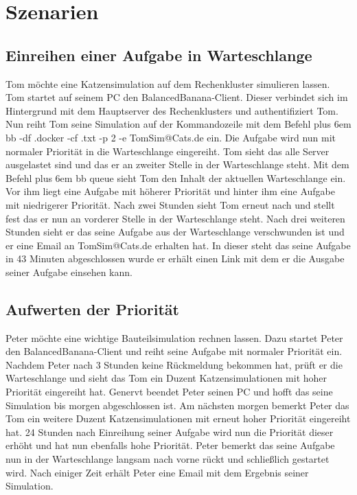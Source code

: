 \documentclass[a4paper,12pt]{article}
\makeatletter
\newenvironment{mycode}
 {\def\@xobeysp{\ }\verbatim\rightskip=0pt plus 6em\relax}
 {\endverbatim}
\makeatother
\begin{document}

\section{Szenarien}

\subsection{\textbf{Einreihen einer Aufgabe in Warteschlange}}
Tom möchte eine Katzensimulation auf dem Rechenkluster simulieren lassen. %
Tom startet auf seinem PC den BalancedBanana-Client. Dieser verbindet sich im Hintergrund mit dem Hauptserver des Rechenklusters und authentifiziert Tom.
Nun reiht Tom seine Simulation auf der Kommandozeile mit dem Befehl 
\begin{mycode}
	bb -df \CatSimulation.docker -cf \Config.txt -p 2 -e TomSim@Cats.de
\end{mycode}
ein. %
Die Aufgabe wird nun mit normaler Priorität in die Warteschlange eingereiht.
Tom sieht das alle Server ausgelastet sind und das er an zweiter Stelle in der Warteschlange steht.
Mit dem Befehl
\begin{mycode}
	bb queue
\end{mycode}
sieht Tom den Inhalt der aktuellen Warteschlange ein. Vor ihm liegt eine Aufgabe mit höherer Priorität und hinter ihm eine Aufgabe mit niedrigerer Priorität.
Nach zwei Stunden sieht Tom erneut nach und stellt fest das er nun an vorderer Stelle in der Warteschlange steht.
Nach drei weiteren Stunden sieht er das seine Aufgabe aus der Warteschlange verschwunden ist und er eine Email an TomSim@Cats.de erhalten hat.
In dieser steht das seine Aufgabe in 43 Minuten abgeschlossen wurde er erhält einen Link mit dem er die Ausgabe seiner Aufgabe einsehen kann.

\subsection{\textbf{Aufwerten der Priorität}}
Peter möchte eine wichtige Bauteilsimulation rechnen lassen.
Dazu startet Peter den BalancedBanana-Client und reiht seine Aufgabe mit normaler Priorität ein.
Nachdem Peter nach 3 Stunden keine Rückmeldung bekommen hat, prüft er die Warteschlange und sieht das Tom ein Duzent Katzensimulationen mit hoher Priorität eingereiht hat.
Genervt beendet Peter seinen PC und hofft das seine Simulation bis morgen abgeschlossen ist.
Am nächsten morgen bemerkt Peter das Tom ein weitere Duzent Katzensimulationen mit erneut hoher Priorität eingereiht hat.
24 Stunden nach Einreihung seiner Aufgabe wird nun die Priorität dieser erhöht und hat nun ebenfalls hohe Priorität.
Peter bemerkt das seine Aufgabe nun in der Warteschlange langsam nach vorne rückt und schließlich gestartet wird. 
Nach einiger Zeit erhält Peter eine Email mit dem Ergebnis seiner Simulation.
\end{document}

